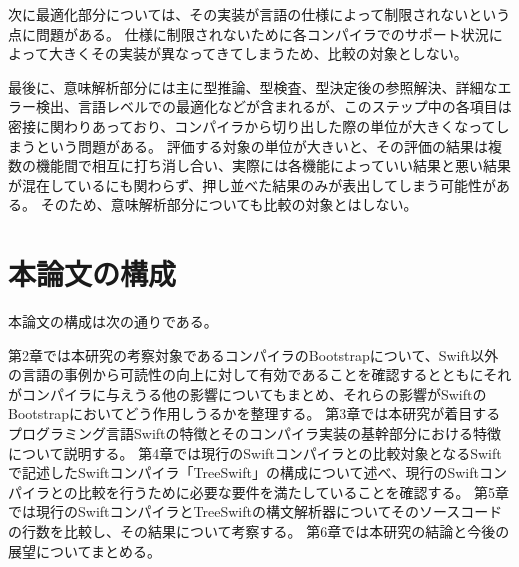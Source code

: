 次に最適化部分については、その実装が言語の仕様によって制限されないという点に問題がある。
仕様に制限されないために各コンパイラでのサポート状況によって大きくその実装が異なってきてしまうため、比較の対象としない。

最後に、意味解析部分には主に型推論、型検査、型決定後の参照解決、詳細なエラー検出、言語レベルでの最適化などが含まれるが、このステップ中の各項目は密接に関わりあっており、コンパイラから切り出した際の単位が大きくなってしまうという問題がある。
評価する対象の単位が大きいと、その評価の結果は複数の機能間で相互に打ち消し合い、実際には各機能によっていい結果と悪い結果が混在しているにも関わらず、押し並べた結果のみが表出してしまう可能性がある。
そのため、意味解析部分についても比較の対象とはしない。


\section{本論文の構成}

本論文の構成は次の通りである。

第2章では本研究の考察対象であるコンパイラのBootstrapについて、Swift以外の言語の事例から可読性の向上に対して有効であることを確認するとともにそれがコンパイラに与えうる他の影響についてもまとめ、それらの影響がSwiftのBootstrapにおいてどう作用しうるかを整理する。
第3章では本研究が着目するプログラミング言語Swiftの特徴とそのコンパイラ実装の基幹部分における特徴について説明する。
第4章では現行のSwiftコンパイラとの比較対象となるSwiftで記述したSwiftコンパイラ「TreeSwift」の構成について述べ、現行のSwiftコンパイラとの比較を行うために必要な要件を満たしていることを確認する。
第5章では現行のSwiftコンパイラとTreeSwiftの構文解析器についてそのソースコードの行数を比較し、その結果について考察する。
第6章では本研究の結論と今後の展望についてまとめる。


